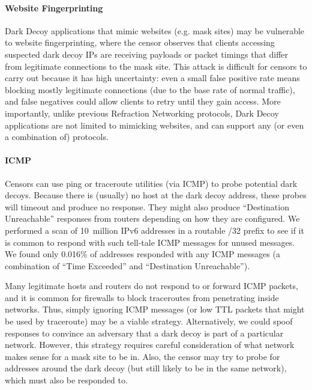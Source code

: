 \documentclass[letterpaper,twocolumn,10pt]{article}
\begin{document}
\paragraph{Website Fingerprinting}
Dark Decoy applications that mimic websites (e.g. mask sites) may be vulnerable
to website fingerprinting, where the censor observes that clients accessing
suspected dark decoy IPs are receiving payloads or packet timings that differ
from legitimate connections to the mask site. This attack is difficult for
censors to carry out because it has high uncertainty: even a small false
positive rate means blocking mostly legitimate connections (due to the base rate
of normal traffic), and false negatives could allow clients to retry until they
gain access. More importantly, unlike previous Refraction Networking protocols,
Dark Decoy applications are not limited to mimicking websites, and can support
any (or even a combination of) protocols.




\paragraph{ICMP}
Censors can use ping or traceroute utilities (via ICMP) to probe potential dark
decoys. Because there is (usually) no host at the dark decoy address, these
probes will timeout and produce no response. They might also produce
``Destination Unreachable'' responses from routers depending on how they are
configured. We performed a scan of 10~million IPv6 addresses in a routable /32
prefix to see if it is common to respond with such tell-tale ICMP messages for
unused messages. We found only 0.016\% of addresses responded with any ICMP
messages (a combination of ``Time Exceeded'' and ``Destination Unreachable'').

Many legitimate hosts and routers do not respond to or forward ICMP packets, and
it is common for firewalls to block traceroutes from penetrating inside
networks. Thus, simply ignoring ICMP messages (or low TTL packets that might be
used by traceroute) may be a viable strategy. %
Alternatively, we could spoof responses to convince an adversary that a dark
decoy is part of a particular network. However, this strategy requires careful
consideration of what network makes sense for a mask site to be in. Also, the
censor may try to probe for addresses around the dark decoy (but still likely to
be in the same network), which must also be responded to.
\end{document}
